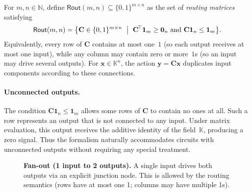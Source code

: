 \documentclass{article}
\newcommand{\K}{\mathbb{K}}                  %
\newcommand{\N}{\mathbb{N}}                  %
\newcommand{\vect}[1]{\mathbf{#1}}           %
\newcommand{\mat}[1]{\mathbf{#1}}            %
\newcommand{\Rout}[2]{\mathsf{Rout}(#1,#2)}
\begin{document}
\begin{definition}
For $m,n\in\N$, define $\Rout{m}{n}\subseteq\{0,1\}^{m\times n}$ as the set of \emph{routing matrices} satisfying
\[
\Rout{m}{n}
=\bigl\{\mat{C}\in\{0,1\}^{m\times n}\ \bigm|\ 
\mat{C}^{\!\top}\mathbf{1}_{m}\ge \mathbf{0}_{n}\ \text{and}\ 
\mat{C}\mathbf{1}_{n}\le \mathbf{1}_{m}\bigr\}.
\]
Equivalently, every row of $\mat{C}$ contains at most one~$1$ (so each output receives at most one input), 
while any column may contain zero or more~$1$s (so an input may drive several outputs). 
For $\vect{x}\in\K^{n}$, the action $\vect{y}=\mat{C}\vect{x}$ duplicates input components according to these connections.
\end{definition}

\paragraph{Unconnected outputs.}
The condition $\mat{C}\mathbf{1}_{n}\le\mathbf{1}_{m}$ allows some rows of $\mat{C}$ to contain no ones at all.  
Such a row represents an output that is not connected to any input.  
Under matrix evaluation, this output receives the additive identity of the field~$\K$, producing a zero signal.  
Thus the formalism naturally accommodates circuits with unconnected outputs without requiring any special treatment.

\begin{figure}[t]
  \centering
  \caption{\textbf{Fan-out (1 input to 2 outputs).} A single input drives both outputs via an explicit junction node. This is allowed by the routing semantics (rows have at most one 1; columns may have multiple 1s).}
  \label{fig:fanout_1_to_2}
\end{figure}
\end{document}
